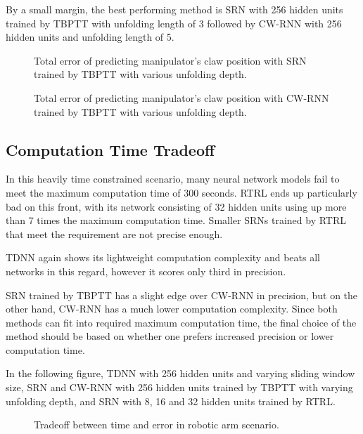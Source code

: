 \documentclass[12pt,oneside]{fithesis2}
\begin{document}
By a small margin, the best performing method is SRN with 256 hidden units trained by TBPTT with unfolding length of 3 followed by CW-RNN with 256 hidden units and unfolding length of 5. 

	\begin{figure}[H]
		\caption{Total error of predicting manipulator's claw position with SRN trained by TBPTT with various unfolding depth.}
		

		\caption{Total error of predicting manipulator's claw position with CW-RNN trained by TBPTT with various unfolding depth.}
		
	\end{figure}
	
\subsection{Computation Time Tradeoff}
In this heavily time constrained scenario, many neural network models fail to meet the maximum computation time of 300 seconds. RTRL ends up particularly bad on this front, with its network consisting of 32 hidden units using up more than 7 times the maximum computation time. Smaller SRNs trained by RTRL that meet the requirement are not precise enough.\par
TDNN again shows its lightweight computation complexity and beats all networks in this regard, however it scores only third in precision. \par
SRN trained by TBPTT has a slight edge over CW-RNN in precision, but on the other hand, CW-RNN has a much lower computation complexity. Since both methods can fit into required maximum computation time, the final choice of the method should be based on whether one prefers increased precision or lower computation time. \par
In the following figure, TDNN with 256 hidden units and varying sliding window size, SRN and CW-RNN with 256 hidden units trained by TBPTT with varying unfolding depth, and SRN with 8, 16 and 32 hidden units trained by RTRL.

	\begin{figure}[H]
		\caption{Tradeoff between time and error in robotic arm scenario.}
		
	\end{figure}
\end{document}

